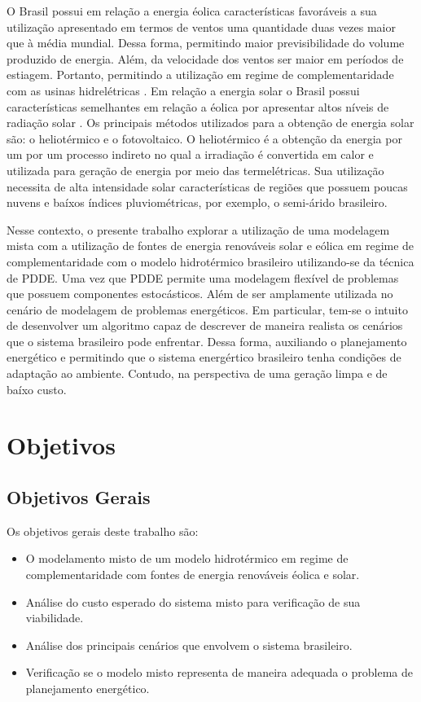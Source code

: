 O Brasil possui em rela\c c\~ao a energia \'eolica  caracter\'isticas favor\'aveis a sua utiliza\c c\~ao apresentado em
termos de ventos uma quantidade duas vezes maior que \`a m\'edia mundial. Dessa forma, permitindo maior previsibilidade
do volume produzido de energia. Al\'em, da velocidade dos ventos ser maior em per\'iodos de estiagem. Portanto,
permitindo a utiliza\c c\~ao em regime de complementaridade com as usinas hidrel\'etricas \cite{an}. Em rela\c c\~ao a
energia solar o Brasil possui caracter\'isticas semelhantes em rela\c c\~ao a \'eolica por apresentar altos n\'iveis de
radia\c c\~ao solar \cite{an}. Os principais m\'etodos utilizados para a obten\c c\~ao de energia solar s\~ao: o
heliot\'ermico e o fotovoltaico. O heliot\'ermico \'e a obten\c c\~ao da energia por um por um processo indireto no qual
a irradia\c c\~ao \'e convertida em calor e utilizada para gera\c c\~ao de energia por meio das termel\'etricas. Sua
utiliza\c c\~ao necessita de alta intensidade solar caracter\'isticas de regi\~oes que possuem poucas nuvens e
ba\'ixos \'indices pluviom\'etricas, por exemplo, o semi-\'arido brasileiro\cite{an}.

Nesse contexto, o presente trabalho explorar a utiliza\c c\~ao de uma modelagem mista com a utiliza\c c\~ao de fontes de
energia renov\'aveis solar e e\'olica em regime de complementaridade com o modelo hidrot\'ermico brasileiro
utilizando-se da t\'ecnica de PDDE. Uma vez que PDDE permite uma modelagem flex\'ivel de problemas que possuem
componentes estoc\'asticos. Al\'em de ser amplamente utilizada no cen\'ario de modelagem de problemas energ\'eticos. Em
particular, tem-se o intuito de desenvolver um algoritmo capaz de descrever de maneira realista os cen\'arios que o
sistema brasileiro pode enfrentar. Dessa
forma, auxiliando o planejamento energ\'etico e permitindo que o sistema energ\'ertico brasileiro tenha condi\c c\~oes de
adapta\c c\~ao ao ambiente. Contudo, na perspectiva de uma gera\c c\~ao  limpa e de ba\'ixo custo.
\section{Objetivos}
\subsection{Objetivos Gerais}
Os objetivos gerais deste trabalho s\~ao:
\begin{itemize}
	\item O modelamento misto de um modelo hidrot\'ermico em regime de complementaridade com fontes de energia renov\'aveis \'eolica e solar.
	\item An\'alise do custo esperado do sistema misto para verifica\c c\~ao de sua viabilidade.
	\item An\'alise dos principais cen\'arios que envolvem o sistema brasileiro. 
	\item Verifica\c c\~ao se o modelo misto representa de maneira adequada o problema de planejamento energ\'etico.
\end{itemize}

